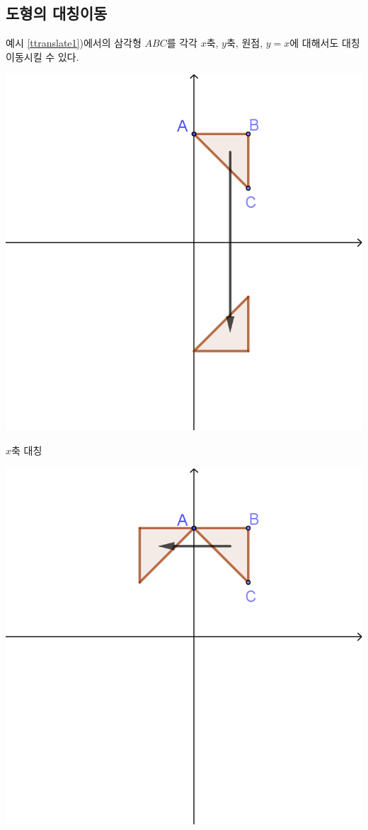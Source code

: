 \documentclass{oblivoir}
\begin{document}
\subsection{도형의 대칭이동}
\exam{}\label{rreflect1}
예시 \ref{ttranslate1})에서의
삼각형 \(ABC\)를 각각 \(x\)축, \(y\)축, 원점, \(y=x\)에 대해서도 대칭이동시킬 수 있다.
\begin{center}
\begin{minipage}{.4\textwidth}
\centering
\includegraphics[width=\textwidth]{rreflect_1-1}
\par\(x\)축 대칭
\end{minipage}
\qquad
\begin{minipage}{.4\textwidth}
\centering
\includegraphics[width=\textwidth]{rreflect_1-2}

\end{minipage}
\end{center}
\end{document}
